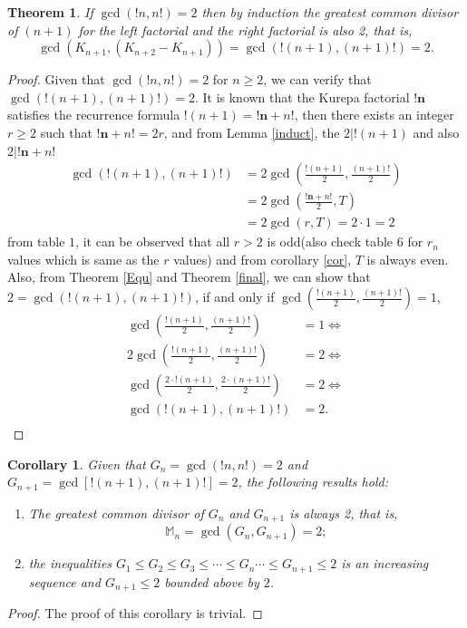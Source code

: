 \documentclass[pdflatex,sn-mathphys-num]{sn-jnl}%
\newtheorem{theorem}{Theorem}
\newtheorem{corollary}{Corollary}
\theoremstyle{thmstyleone}%
\theoremstyle{thmstyletwo}%
\theoremstyle{thmstylethree}%
\begin{document}
\begin{theorem}\label{induction}
   If $\gcd(!n, n!)=2$ then by induction the greatest common divisor of $(n+1)$ for the left factorial and the right factorial is also 2, that is, $$\gcd ( K_{n+1}, (K_{n+2}- K_{n+1}))=\gcd (!(n+1), (n+1)!)=2.$$
\end{theorem}
\begin{proof}
    Given that $\gcd(!n,n!)=2$ for $n\geq2$, we can verify that $\gcd (!(n+1), (n+1)!)=2$.
    It is known that the Kurepa factorial $\mathbf{!n}$ satisfies the recurrence formula $!(n+1)=\mathbf{!n}+n!$, then there exists an integer $r\geq 2$ such that $\mathbf{!n}+n!=2r$, and from Lemma \ref{induct}, the $2|!(n+1)$ and also $2|\mathbf{!n}+n!$
    \begin{align*}
        \gcd (!(n+1), (n+1)!)&=2\gcd \left(\frac{!(n+1)}{2}, \frac{ (n+1)!}{2}\right)\\
        &=2\gcd \left(\frac{\mathbf{!n}+n!}{2}, T\right)\\
        &=2\gcd \left(r, T\right)= 2\cdotp 1=2 
    \end{align*}
from table $1$, it can be observed that all $r>2$ is odd(also check table 6 for $r_n$ values which is same as the $r$ values) and from corollary \ref{cor}, $T$ is always even.
Also, from Theorem \ref{Equ} and Theorem \ref{final}, we can show that $2=\gcd (!(n+1), (n+1)!)$, if and only if $\gcd \left(\frac{!(n+1)}{2}, \frac{ (n+1)!}{2}\right)=1$, 
\begin{align*}
    \gcd \left(\frac{!(n+1)}{2}, \frac{ (n+1)!}{2}\right)&=1 \iff\\
    2\gcd \left(\frac{!(n+1)}{2}, \frac{ (n+1)!}{2}\right)&=2 \iff \\
    \gcd \left(\frac{2\cdotp !(n+1)}{2}, \frac{2 \cdotp (n+1)!}{2}\right)&=2 \iff \\
    \gcd (!(n+1), (n+1)!)&=2. \\
\end{align*}

\end{proof}

\begin{corollary}\label{gcd}
Given that $G_n=\gcd(!n, n!)=2$ and $G_{n+1}=\gcd [!(n+1), (n+1)!]=2$, the following results hold:
\begin{enumerate}
    \item The greatest common divisor of $G_n$ and $G_{n+1}$ is always 2, that is, $$\mathbb{M}_n=\gcd(G_n, G_{n+1})=2;$$
    \item the inequalities $G_1\leq G_2\leq G_3\leq \cdots \leq G_n\cdots\leq G_{n+1}\leq 2$ is an increasing sequence and $G_{n+1}\leq 2$ bounded above by $2$.
\end{enumerate}
\end{corollary}
\begin{proof}
    The proof of this corollary is trivial.
\end{proof}
\end{document}
